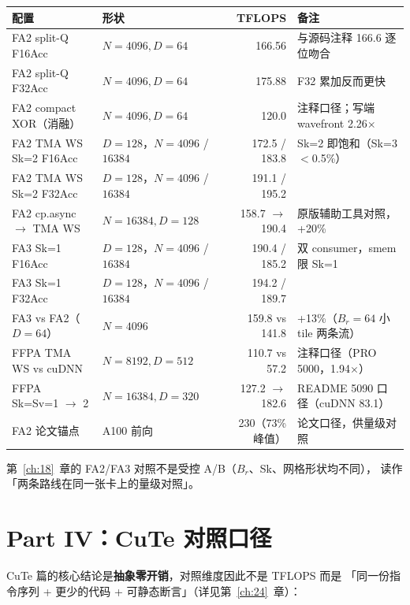 \begin{center}\small
\begin{tabular}{lp{3.4cm}rp{4.6cm}}
\toprule
配置 & 形状 & TFLOPS & 备注 \\
\midrule
FA2 split-Q F16Acc & $N{=}4096, D{=}64$ & 166.56 & 与源码注释 166.6 逐位吻合 \\
FA2 split-Q F32Acc & $N{=}4096, D{=}64$ & 175.88 & F32 累加反而更快 \\
FA2 compact XOR（消融） & $N{=}4096, D{=}64$ & 120.0 & 注释口径；写端 wavefront 2.26$\times$ \\
FA2 TMA WS Sk=2 F16Acc & $D{=}128$，$N{=}4096$ / $16384$ & 172.5 / 183.8 & Sk=2 即饱和（Sk=3 $<$0.5\%） \\
FA2 TMA WS Sk=2 F32Acc & $D{=}128$，$N{=}4096$ / $16384$ & 191.1 / 195.2 & \\
FA2 cp.async $\to$ TMA WS & $N{=}16384, D{=}128$ & 158.7 $\to$ 190.4 & 原版辅助工具对照，+20\% \\
FA3 Sk=1 F16Acc & $D{=}128$，$N{=}4096$ / $16384$ & 190.4 / 185.2 & 双 consumer，smem 限 Sk=1 \\
FA3 Sk=1 F32Acc & $D{=}128$，$N{=}4096$ / $16384$ & 194.2 / 189.7 & \\
FA3 vs FA2（$D{=}64$） & $N{=}4096$ & 159.8 vs 141.8 & +13\%（$B_r{=}64$ 小 tile 两条流） \\
FFPA TMA WS vs cuDNN & $N{=}8192, D{=}512$ & 110.7 vs 57.2 & 注释口径（PRO 5000，1.94$\times$） \\
FFPA Sk=Sv=1 $\to$ 2 & $N{=}16384, D{=}320$ & 127.2 $\to$ 182.6 & README 5090 口径（cuDNN 83.1） \\
FA2 论文锚点 & A100 前向 & 230（73\% 峰值） & 论文口径，供量级对照 \\
\bottomrule
\end{tabular}
\end{center}

第~\ref{ch:18}~章的 FA2/FA3 对照不是受控 A/B（$B_r$、Sk、网格形状均不同），
读作「两条路线在同一张卡上的量级对照」。

\section{Part IV：CuTe 对照口径}

CuTe 篇的核心结论是\textbf{抽象零开销}，对照维度因此不是 TFLOPS 而是
「同一份指令序列 + 更少的代码 + 可静态断言」（详见第~\ref{ch:24}~章）：

